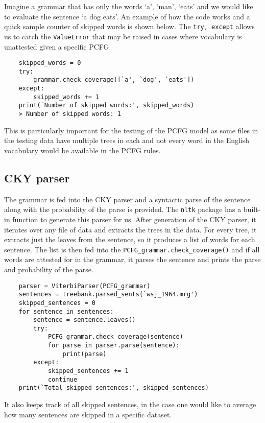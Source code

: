 \documentclass{article}
\begin{document}
Imagine a grammar that has only the words {`a', `man', `eats'} and we would like to evaluate the sentence `a dog eats'. An example of how the code works and a quick sample counter of skipped words is shown below. The \verb|try, except|  allows us to catch the \verb|ValueError| that may be raised in cases where vocabulary is unattested given a specific PCFG.

\begin{verbatim}
    skipped_words = 0
    try: 
        grammar.check_coverage([`a', `dog', `eats'])
    except: 
        skipped_words += 1
    print(`Number of skipped words:', skipped_words)
    > Number of skipped words: 1
    \end{verbatim}

This is particularly important for the testing of the PCFG model as some files in the testing data have multiple trees in each and not every word in the English vocabulary would be available in the PCFG rules. 

\subsection{CKY parser}
The grammar is fed into the CKY parser and a syntactic parse of the sentence along with the probability of the parse is provided. The \verb|nltk| package has a built-in function to generate this parser for us. After generation of the CKY parser, it iterates over any file of data and extracts the trees in the data. For every tree, it extracts just the leaves from the sentence, so it produces a list of words for each sentence. The list is then fed into the \verb|PCFG_grammar.check_coverage()| and if all words are attested for in the grammar, it parses the sentence and prints the parse and probability of the parse.

\begin{verbatim}
    parser = ViterbiParser(PCFG_grammar)
    sentences = treebank.parsed_sents(`wsj_1964.mrg')
    skipped_sentences = 0
    for sentence in sentences: 
        sentence = sentence.leaves()
        try:
            PCFG_grammar.check_coverage(sentence)
            for parse in parser.parse(sentence):
                print(parse)
        except: 
            skipped_sentences += 1
            continue
    print(`Total skipped sentences:', skipped_sentences) 
\end{verbatim}

It also keeps track of all skipped sentences, in the case one would like to average how many sentences are skipped in a specific dataset. 
\end{document}
